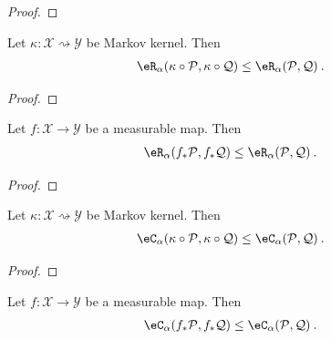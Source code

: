 \begin{proof}\leanok

\end{proof}


\begin{lemma}\label{lem:erenyiDiv_comp_le}
  \leanok
Let $\kappa : \mathcal{X} \rightsquigarrow \mathcal{Y}$ be Markov kernel. Then
\begin{align*}
  \eR_\alpha(\kappa \circ \mathcal{P}, \kappa \circ \mathcal{Q})
  &\le \eR_\alpha(\mathcal{P}, \mathcal{Q})
  \: .
\end{align*}
\end{lemma}

\begin{proof}\leanok

\end{proof}


\begin{lemma}\label{lem:erenyiDiv_map_le}
  \leanok
Let $f : \mathcal{X} \to \mathcal{Y}$ be a measurable map. Then
\begin{align*}
  \eR_\alpha(f_*\mathcal{P}, f_*\mathcal{Q})
  &\le \eR_\alpha(\mathcal{P}, \mathcal{Q})
  \: .
\end{align*}
\end{lemma}

\begin{proof}\leanok

\end{proof}


\begin{lemma}\label{lem:echernoffDiv_comp_le}
  \leanok
Let $\kappa : \mathcal{X} \rightsquigarrow \mathcal{Y}$ be Markov kernel. Then
\begin{align*}
  \eC_\alpha(\kappa \circ \mathcal{P}, \kappa \circ \mathcal{Q})
  &\le \eC_\alpha(\mathcal{P}, \mathcal{Q})
  \: .
\end{align*}
\end{lemma}

\begin{proof}\leanok

\end{proof}


\begin{lemma}\label{lem:echernoffDiv_map_le}
  \leanok
Let $f : \mathcal{X} \to \mathcal{Y}$ be a measurable map. Then
\begin{align*}
  \eC_\alpha(f_*\mathcal{P}, f_*\mathcal{Q})
  &\le \eC_\alpha(\mathcal{P}, \mathcal{Q})
  \: .
\end{align*}
\end{lemma}

